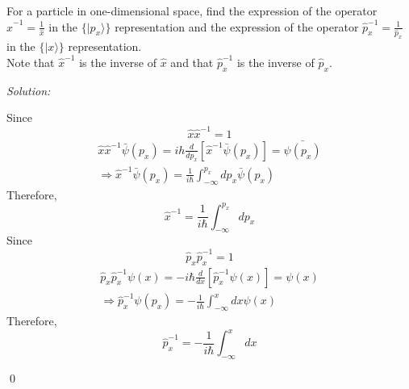\documentclass[12pt,a4paper]{article}
\newenvironment{problem}[2][Problem]{\begin{trivlist}
\item[\hskip \labelsep {\bfseries #1}\hskip \labelsep {\bfseries #2.}]}{\end{trivlist}}
\newenvironment{sol}
    {\emph{Solution:}
    }
    {
    \qed
    }
\begin{document}
\begin{problem}{5}
For a particle in one-dimensional space, find the expression of the operator $\hat{x}^{-1}=\frac{1}{\hat{x}}$ in the $\{|p_x\rangle\}$ representation and the expression of the operator $\hat{p}_x^{-1}=\frac{1}{\hat{p}_x}$ in the $\{|x\rangle\}$ representation.\\
Note that $\hat{x}^{-1}$ is the inverse of $\hat{x}$ and that $\hat{p}_x^{-1}$ is the inverse of $\hat{p}_x$.
\end{problem}
\begin{sol}
Since
\begin{equation}
\hat{x}\hat{x}^{-1}=1
\end{equation}
\begin{gather}
\hat{x}\hat{x}^{-1}\bar{\psi}(p_x)=ih\frac{d}{dp_x}[\hat{x}^{-1}\bar{\psi}(p_x)]=\bar{\psi(p_x)}\\
\Longrightarrow\hat{x}^{-1}\bar{\psi}(p_x)=\frac{1}{i\hbar}\int_{-\infty}^{p_x}dp_x\bar{\psi}(p_x)
\end{gather}
Therefore,
\begin{equation}
\hat{x}^{-1}=\frac{1}{i\hbar}\int_{-\infty}^{p_x}dp_x
\end{equation}
Since
\begin{equation}
\hat{p}_x\hat{p}_x^{-1}=1
\end{equation}
\begin{gather}
\hat{p}_x\hat{p}_x^{-1}\psi(x)=-i\hbar\frac{d}{dx}[\hat{p}_x^{-1}\psi(x)]=\psi(x)\\
\Longrightarrow\hat{p}_x^{-1}\psi(p_x)=-\frac{1}{i\hbar}\int_{-\infty}^{x}dx\psi(x)
\end{gather}
Therefore,
\begin{equation}
\hat{p}_x^{-1}=-\frac{1}{i\hbar}\int_{-\infty}^{x}dx
\end{equation}
\end{sol}
\end{document}

